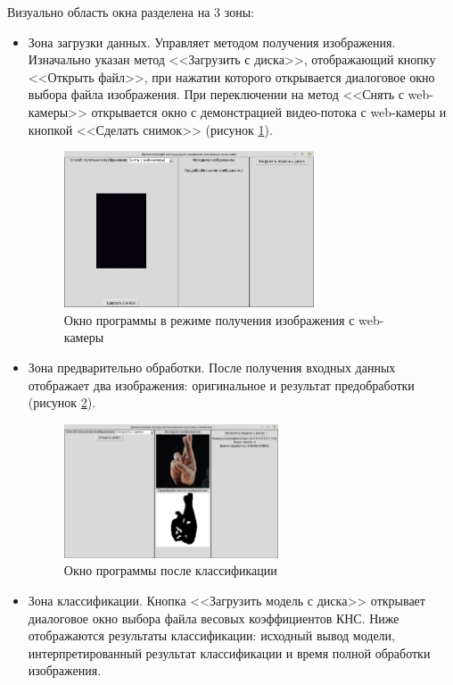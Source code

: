 Визуально область окна разделена на 3 зоны:
\begin{itemize}
	\item Зона загрузки данных. Управляет методом получения изображения. Изначально указан метод <<Загрузить с диска>>, отображающий кнопку <<Открыть файл>>, при нажатии которого открывается диалоговое окно выбора файла изображения. При переключении на метод <<Снять с web-камеры>> открывается окно с демонстрацией видео-потока с web-камеры и кнопкой <<Сделать снимок>> (рисунок \ref{impl:main_webcam}).
	
	\begin{figure}[!h]
		\centering
		\includegraphics[width=0.7\textwidth]{inc/img/main_webcam}
		\caption{Окно программы в режиме получения изображения с web-камеры}
		\label{impl:main_webcam}
	\end{figure}

	\item Зона предварительно обработки. После получения входных данных отображает два изображения: оригинальное и результат предобработки (рисунок \ref{impl:main}).
	
	\begin{figure}[!h]
		\centering
		\includegraphics[width=0.6\textwidth]{inc/img/main}
		\caption{Окно программы после классификации}
		\label{impl:main}
	\end{figure}

	\item Зона классификации. Кнопка <<Загрузить модель с диска>> открывает диалоговое окно выбора файла весовых коэффициентов КНС. Ниже отображаются результаты классификации: исходный вывод модели, интерпретированный результат классификации и время полной обработки изображения.
\end{itemize}

